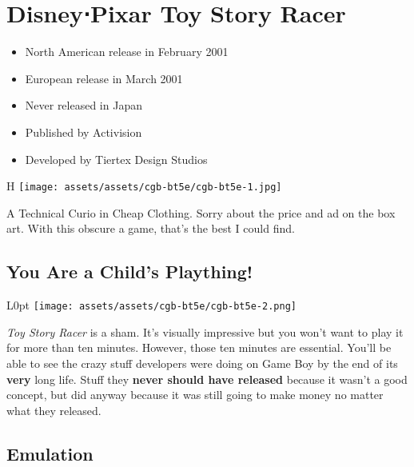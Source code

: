 \documentclass{book}
\begin{document}
\begingroup \chapter*{Disney⋅Pixar Toy Story Racer} \endgroup

\begin{itemize} \setlength\itemsep{-0.4em}
\item North American release in February 2001
\item European release in March 2001
\item Never released in Japan
\item Published by Activision
\item Developed by Tiertex Design Studios
\end{itemize}\noindent

\begin{wrapfigure}{H}{\linewidth}
\vskip 4pt
\centering \texttt{[image: assets/assets/cgb-bt5e/cgb-bt5e-1.jpg]}\par\pagetwodescription A Technical Curio in Cheap Clothing. Sorry about the price and ad on the box art. With this obscure a game, that’s the best I could find.\end{wrapfigure}
\clearpage

\FloatBarrier\needspace{5pt}\section*{You Are a Child’s Plaything!}\nopagebreak[4]

\begin{wrapfigure}{L}{0pt} \texttt{[image: assets/assets/cgb-bt5e/cgb-bt5e-2.png]}\end{wrapfigure}
\emph{Toy Story Racer} is a sham. It’s visually impressive but you won’t want to play it for more than ten minutes. However, those ten minutes are essential. You’ll be able to see the crazy stuff developers were doing on Game Boy by the end of its \textbf{very} long life. Stuff they \textbf{never should have released} because it wasn’t a good concept, but did anyway because it was still going to make money no matter what they released.

\FloatBarrier\needspace{5pt}\section*{Emulation}\nopagebreak[4]
\end{document}
